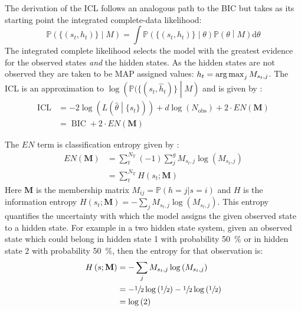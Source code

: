 The derivation of the ICL follows an analogous path to the BIC but takes as its starting point the integrated complete-data likelihood: 
\begin{equation}\label{eqn:class_lik_int}
    \mathbb{P}\left(\{(s_t, h_t)\}\middle | M \right) = \int \mathbb{P}\left(\{(s_{t}, h_{t})\}\middle |\theta \right)\mathbb{P}\left(\theta\middle | M\right) \mathrm{d}\theta
\end{equation}
The integrated complete likelihood selects the model with the greatest evidence for the observed states \emph{and} the hidden states. As the hidden states are not observed they are taken to be MAP assigned values: $h_t = \operatorname*{arg\,max}_{j} M_{s_{t}, j}$. The ICL is an approximation to $\log{\left(\mathbb{P}(\{(s_t, \hat{h}_t)\}\middle | M \right)}$ and is given by \cite{biernackiAssessingMixtureModel2000a}:
\begin{equation}\label{eqn:icl}
\begin{split}
        \operatorname{ICL} &= -2\log{\left(L\left(\hat{\theta}\middle|\{s_t\}\right)\right)} + d\log{\left(N_{\mathrm{obs}}\right)} +2\cdot EN\left(\mathbf{M}\right)     \\
        & = \operatorname{BIC} + 2\cdot EN\left(\mathbf{M}\right)
\end{split}
\end{equation}

The $EN$ term  is classification entropy given by \cite{biernackiAssessingMixtureModel2000a}:
\begin{equation}\label{eqn:class_entropy}
\begin{split}
     EN\left(\mathbf{M}\right) & = \sum_{t}^{N_{\mathrm{T}}}(-1)\sum_{j}^{g} M_{s_{t}, j}\log{\left(M_{s_{t}, j}\right)}  \\ 
     & =\sum_{t}^{N_{\mathrm{T}}} H\left(s_{t}; \mathbf{M}\right)
\end{split}
\end{equation}
Here $\mathbf{M}$ is the membership matrix $M_{ij}= \mathbb{P}(h=j|s=i)$ and $H$ is the information entropy $H\left(s_{t};\mathbf{M}\right) = -\sum_{j} M_{s_{t}, j}\log{\left(M_{s_t, j}\right)}$. This entropy quantifies the uncertainty with which the model assigns the given observed state to a hidden state. For example in a two hidden state system, given an observed state which could belong in hidden state 1 with probability \SI{50}{\percent} or in hidden state 2 with probability \SI{50}{\percent}, then the entropy for that observation is:
\begin{equation}
\begin{split}
    H\left(s; \mathbf{M}\right) & =  -\sum_{j} M_{s_{t}, j}\log{\left(M_{s_t, j}\right)} \\
    & = -\sfrac{1}{2}\log{\left(\sfrac{1}{2}\right)} - \sfrac{1}{2}\log{\left(\sfrac{1}{2}\right)} \\
    & = \log{\left(2\right)}
\end{split}
\end{equation}
 
